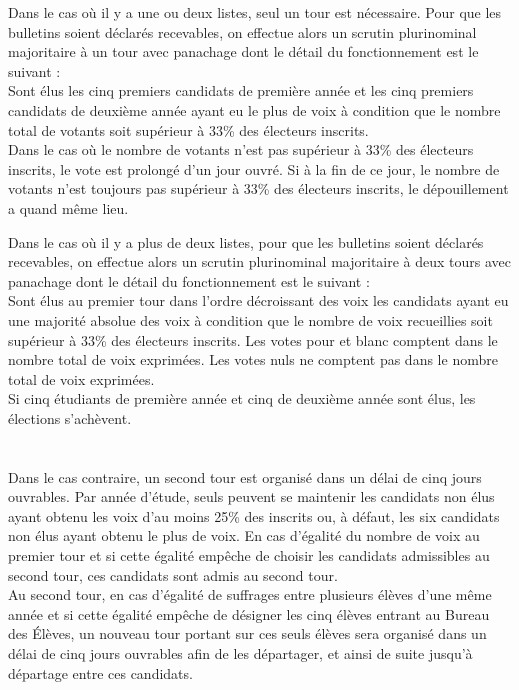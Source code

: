 \documentclass{article} %
\begin{document}
				Dans le cas où il y a une ou deux listes, seul un tour est
				nécessaire. Pour que les bulletins soient déclarés recevables, on
				effectue alors un scrutin plurinominal majoritaire à un tour avec
				panachage dont le détail du fonctionnement est le suivant :\\
				Sont élus les cinq premiers candidats de première année et les cinq
				premiers candidats de deuxième année ayant eu le plus de voix à
				condition que le nombre total de votants soit supérieur à 33\% des
				électeurs inscrits.\\
				Dans le cas où le nombre de votants n’est pas supérieur à 33\% des
				électeurs inscrits, le vote est prolongé d’un jour ouvré. Si à la fin
				de ce jour, le nombre de votants n’est toujours pas supérieur à 33\%
				des électeurs inscrits, le dépouillement a quand même lieu.

				Dans le cas où il y a plus de deux listes, pour que les bulletins
				soient déclarés recevables, on effectue alors un scrutin plurinominal
				majoritaire à deux tours avec panachage dont le détail du
				fonctionnement est le suivant :\\
				Sont élus au premier tour dans l’ordre décroissant des voix les
				candidats ayant eu une majorité absolue des voix à condition que le
				nombre de voix recueillies soit supérieur à 33\% des électeurs
				inscrits. Les votes pour et blanc comptent dans le nombre total de
				voix exprimées. Les votes nuls ne comptent pas dans le nombre total
				de voix exprimées.\\
				Si cinq étudiants de première année et cinq de deuxième année sont
				élus, les élections s’achèvent.\\ \\ \\
				Dans le cas contraire, un second tour est organisé dans un délai de
				cinq jours ouvrables. Par année d’étude, seuls peuvent se maintenir
				les candidats non élus ayant obtenu les voix d’au moins 25\% des
				inscrits ou, à défaut, les six candidats non élus ayant obtenu le
				plus de voix. En cas d’égalité du nombre de voix au premier tour et
				si cette égalité empêche de choisir les candidats admissibles au
				second tour, ces candidats sont admis au second tour.\\
				Au second tour, en cas d'égalité de suffrages entre plusieurs élèves
				d'une même année et si cette égalité empêche de désigner les cinq
				élèves entrant au Bureau des Élèves, un nouveau tour portant sur ces
				seuls élèves sera organisé dans un délai de cinq jours ouvrables afin
				de les départager, et ainsi de suite jusqu’à départage entre ces
				candidats.
\end{document}
